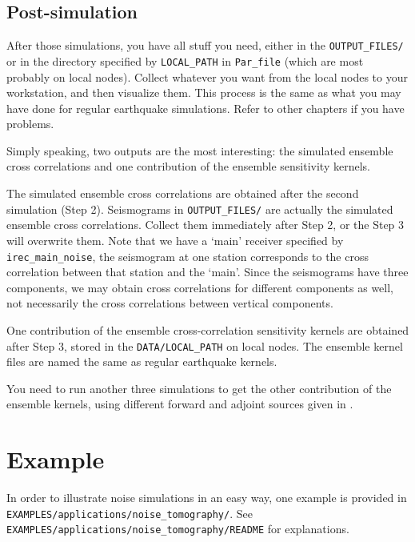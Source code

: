\subsection{Post-simulation}

After those simulations, you have all stuff you need, either in the
\texttt{OUTPUT\_FILES/} or in the directory specified by \texttt{LOCAL\_PATH}
in \texttt{Par\_file} (which are most probably on local nodes).
Collect whatever you want from the local nodes to your workstation,
and then visualize them. This process is the same as what you may
have done for regular earthquake simulations. Refer to other chapters
if you have problems.\newline


Simply speaking, two outputs are the most interesting: the simulated
ensemble cross correlations and one contribution of the ensemble sensitivity
kernels.\newline


The simulated ensemble cross correlations are obtained after the second
simulation (Step 2). Seismograms in \texttt{OUTPUT\_FILES/} are actually
the simulated ensemble cross correlations. Collect them immediately
after Step 2, or the Step 3 will overwrite them. Note that we have
a `main' receiver specified by \texttt{irec\_main\_noise}, the
seismogram at one station corresponds to the cross correlation between
that station and the `main'. Since the seismograms have three components,
we may obtain cross correlations for different components as well,
not necessarily the cross correlations between vertical components.\newline


One contribution of the ensemble cross-correlation sensitivity kernels
are obtained after Step 3, stored in the \texttt{DATA/LOCAL\_PATH}
on local nodes. The ensemble kernel files are named the same as regular
earthquake kernels.\newline


You need to run another three simulations to get the other contribution
of the ensemble kernels, using different forward and adjoint sources
given in \citet{trompetal2010}.


\section{Example}

In order to illustrate noise simulations in an easy way, one example
is provided in \texttt{EXAMPLES/applications/noise\_tomography/}. See \texttt{EXAMPLES/applications/noise\_tomography/README}
for explanations. \newline


